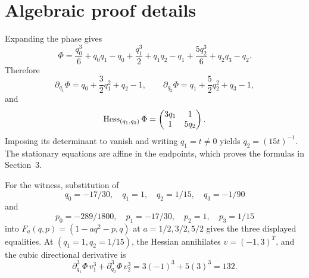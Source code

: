 \section{Algebraic proof details}

Expanding the phase gives
\[
 \Phi=\frac{q_0^3}{6}+q_0q_1-q_0
      +\frac{q_1^3}{2}+q_1q_2-q_1
      +\frac{5q_2^3}{6}+q_2q_3-q_2.
\]
Therefore
\[
 \partial_{q_1}\Phi=q_0+\frac32q_1^2+q_2-1,
 \qquad
 \partial_{q_2}\Phi=q_1+\frac52q_2^2+q_3-1,
\]
and
\[
 \operatorname{Hess}_{(q_1,q_2)}\Phi
 =\begin{pmatrix}3q_1&1\\1&5q_2\end{pmatrix}.
\]
Imposing its determinant to vanish and writing \(q_1=t\ne0\) yields
\(q_2=(15t)^{-1}\).  The stationary equations are affine in the endpoints,
which proves the formulas in Section~3.

For the witness, substitution of
\[
 q_0=-17/30,\quad q_1=1,\quad q_2=1/15,\quad q_3=-1/90
\]
and
\[
 p_0=-289/1800,\quad p_1=-17/30,\quad p_2=1,\quad p_3=1/15
\]
into \(F_a(q,p)=(1-aq^2-p,q)\) at \(a=1/2,3/2,5/2\) gives the three displayed
equalities.  At \((q_1=1,q_2=1/15)\), the Hessian annihilates
\(v=(-1,3)^T\), and the cubic directional derivative is
\[
 \partial_{q_1}^3\Phi\,v_1^3+
 \partial_{q_2}^3\Phi\,v_2^3=3(-1)^3+5(3)^3=132.
\]
